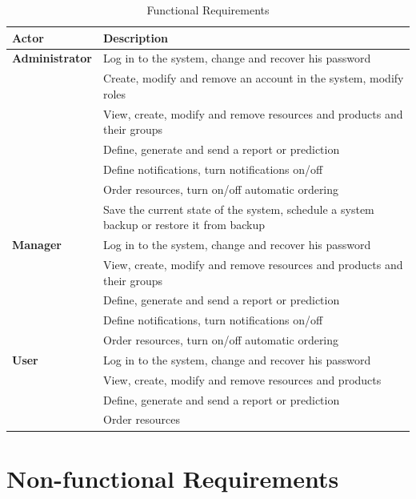 \documentclass[a4paper,11pt,twoside]{report}
\theoremstyle{definition}
\begin{document}
\begin{table}[!htbp]
\caption[Functional Requirements]{Functional Requirements}
\label{Functional Requirements}
\tabularnewline
\centering
\begin{tabular}{|p{3cm}||p{13cm}|}
\hline
\textbf{Actor} & \textbf{Description} \\ \hline
\textbf{Administrator} & Log in to the system, change and recover his password\\  \cline{2-2}
\texttt{} & Create, modify and remove an account in the system, modify roles\\  \cline{2-2}
\texttt{} & View, create, modify and remove resources and products and their groups\\ \cline{2-2}
\texttt{} & Define, generate and send a report or prediction\\ \cline{2-2}
\texttt{} & Define notifications, turn notifications on/off\\ \cline{2-2}
\texttt{} & Order resources, turn on/off automatic ordering\\ \cline{2-2}
\texttt{} & Save the current state of the system, schedule a system backup or restore it from backup\\ \hline
\textbf{Manager} & Log in to the system, change and recover his password\\  \cline{2-2}
\texttt{} & View, create, modify and remove resources and products and their groups\\ \cline{2-2}
\texttt{} & Define, generate and send a report or prediction\\ \cline{2-2}
\texttt{} & Define notifications, turn notifications on/off\\ \cline{2-2}
\texttt{} & Order resources, turn on/off automatic ordering\\ \hline
\textbf{User} & Log in to the system, change and recover his password\\  \cline{2-2}
\texttt{} & View, create, modify and remove resources and products\\ \cline{2-2}
\texttt{} & Define, generate and send a report or prediction\\ \cline{2-2}
\texttt{} & Order resources\\ \hline

\end{tabular}
\end{table}

\section{Non-functional Requirements}
\end{document}
